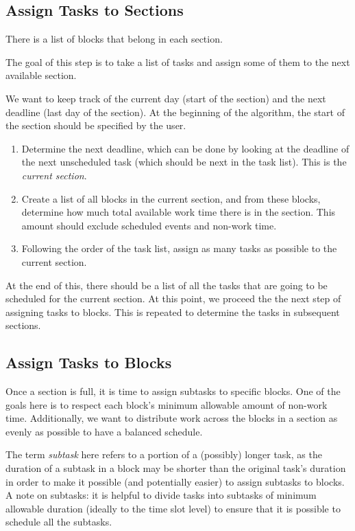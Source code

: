 \documentclass{article}
\begin{document}
	\subsection{Assign Tasks to Sections}
		
		There is a list of blocks that belong in each section.
		
		The goal of this step is to take a list of tasks and assign some of them to the next available section.
		
		We want to keep track of the current day (start of the section) and the next deadline (last day of the section).
		At the beginning of the algorithm, the start of the section should be specified by the user.
		\begin{enumerate}
			\item 
				Determine the next deadline, which can be done by looking at the deadline of the next unscheduled task (which should be next in the task list). This is the \emph{current section}.
			\item 
				Create a list of all blocks in the current section, and from these blocks, determine how much total available work time there is in the section.
				This amount should exclude scheduled events and non-work time.
			\item
				Following the order of the task list, assign as many tasks as possible to the current section.
		\end{enumerate}
		At the end of this, there should be a list of all the tasks that are going to be scheduled for the current section.
		At this point, we proceed the the next step of assigning tasks to blocks.
		This is repeated to determine the tasks in subsequent sections.
		
	\subsection{Assign Tasks to Blocks}
		Once a section is full, it is time to assign subtasks to specific blocks.
		One of the goals here is to respect each block's minimum allowable amount of non-work time.
		Additionally, we want to distribute work across the blocks in a section as evenly as possible to have a balanced schedule.
		
		The term \emph{subtask} here refers to a portion of a (possibly) longer task, as the duration of a subtask in a block may be shorter than the original task's duration in order to make it possible (and potentially easier) to assign subtasks to blocks.
		A note on subtasks: it is helpful to divide tasks into subtasks of minimum allowable duration (ideally to the time slot level) to ensure that it is possible to schedule all the subtasks.
		
\end{document}
